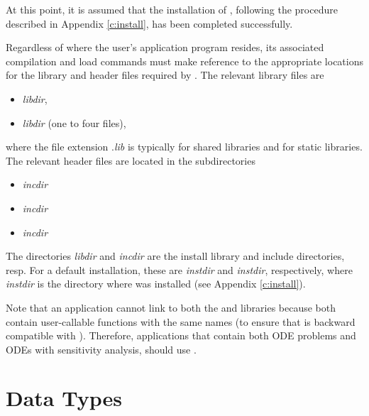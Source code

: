 At this point, it is assumed that the installation of {\cvodes},
following the procedure described in Appendix \ref{c:install}, has
been completed successfully.

Regardless of where the user's application program resides, its
associated compilation and load commands must make reference to the
appropriate locations for the library and header files required by
{\cvodes}.  The relevant library files are
\begin{itemize}
\item {\em libdir},
\item {\em libdir} (one to four files),
\end{itemize}
where the file extension .{\em lib} is typically  for shared libraries
and  for static libraries. The relevant header files are located in
the subdirectories
\begin{itemize}
\item {\em incdir}
\item {\em incdir}
\item {\em incdir}
\end{itemize}
The directories {\em libdir} and {\em incdir} are the install library and include
directories, resp.  For a default installation, these are {\em instdir} and
{\em instdir}, respectively, where {\em instdir} is the directory
where {\sundials} was installed (see Appendix \ref{c:install}).

Note that an application cannot link to both the {\cvode} and {\cvodes} libraries
because both contain user-callable functions with the same names (to ensure that
{\cvodes} is backward compatible with {\cvode}). Therefore, applications that contain
both ODE problems and ODEs with sensitivity analysis, should use {\cvodes}.


\section{Data Types}\label{s:types}



